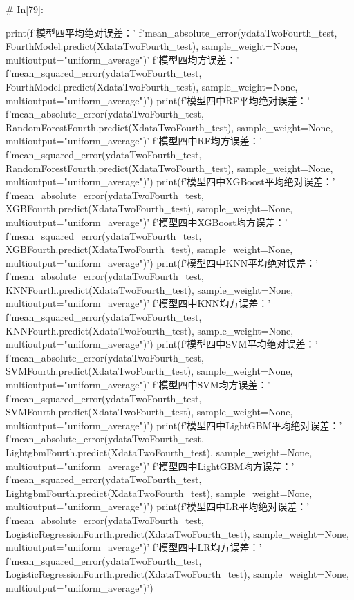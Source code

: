 \documentclass{MathorCupmodeling}
\begin{document}
\begin{python}
# In[79]:


print(f'模型四平均绝对误差：'
      f'{mean_absolute_error(ydataTwoFourth_test, FourthModel.predict(XdataTwoFourth_test), sample_weight=None, multioutput="uniform_average")}\n'
      f'模型四均方误差：'
      f'{mean_squared_error(ydataTwoFourth_test, FourthModel.predict(XdataTwoFourth_test), sample_weight=None, multioutput="uniform_average")}')
print(f'模型四中RF平均绝对误差：'
      f'{mean_absolute_error(ydataTwoFourth_test, RandomForestFourth.predict(XdataTwoFourth_test), sample_weight=None, multioutput="uniform_average")}\n'
      f'模型四中RF均方误差：'
      f'{mean_squared_error(ydataTwoFourth_test, RandomForestFourth.predict(XdataTwoFourth_test), sample_weight=None, multioutput="uniform_average")}')
print(f'模型四中XGBoost平均绝对误差：'
      f'{mean_absolute_error(ydataTwoFourth_test, XGBFourth.predict(XdataTwoFourth_test), sample_weight=None, multioutput="uniform_average")}\n'
      f'模型四中XGBoost均方误差：'
      f'{mean_squared_error(ydataTwoFourth_test, XGBFourth.predict(XdataTwoFourth_test), sample_weight=None, multioutput="uniform_average")}')
print(f'模型四中KNN平均绝对误差：'
      f'{mean_absolute_error(ydataTwoFourth_test, KNNFourth.predict(XdataTwoFourth_test), sample_weight=None, multioutput="uniform_average")}\n'
      f'模型四中KNN均方误差：'
      f'{mean_squared_error(ydataTwoFourth_test, KNNFourth.predict(XdataTwoFourth_test), sample_weight=None, multioutput="uniform_average")}')
print(f'模型四中SVM平均绝对误差：'
      f'{mean_absolute_error(ydataTwoFourth_test, SVMFourth.predict(XdataTwoFourth_test), sample_weight=None, multioutput="uniform_average")}\n'
      f'模型四中SVM均方误差：'
      f'{mean_squared_error(ydataTwoFourth_test, SVMFourth.predict(XdataTwoFourth_test), sample_weight=None, multioutput="uniform_average")}')
print(f'模型四中LightGBM平均绝对误差：'
      f'{mean_absolute_error(ydataTwoFourth_test, LightgbmFourth.predict(XdataTwoFourth_test), sample_weight=None, multioutput="uniform_average")}\n'
      f'模型四中LightGBM均方误差：'
      f'{mean_squared_error(ydataTwoFourth_test, LightgbmFourth.predict(XdataTwoFourth_test), sample_weight=None, multioutput="uniform_average")}')
print(f'模型四中LR平均绝对误差：'
      f'{mean_absolute_error(ydataTwoFourth_test, LogisticRegressionFourth.predict(XdataTwoFourth_test), sample_weight=None, multioutput="uniform_average")}\n'
      f'模型四中LR均方误差：'
      f'{mean_squared_error(ydataTwoFourth_test, LogisticRegressionFourth.predict(XdataTwoFourth_test), sample_weight=None, multioutput="uniform_average")}')



\end{python}
\end{document}
